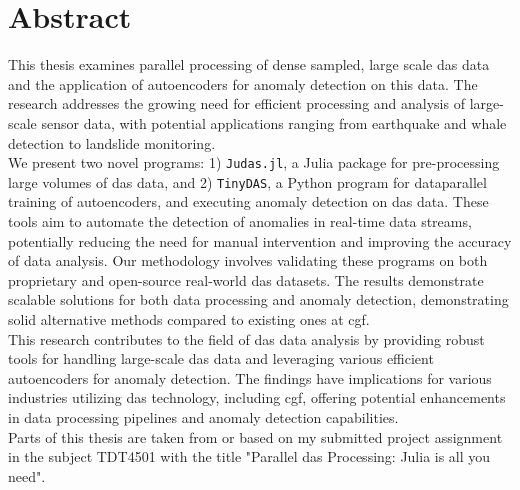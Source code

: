 \chapter*{Abstract}

This thesis examines parallel processing of dense sampled, large scale \acrfull{das} data and the application of autoencoders for anomaly detection on this data. The research addresses the growing need for efficient processing and analysis of large-scale sensor data, with potential applications ranging from earthquake and whale detection to landslide monitoring. \\

We present two novel programs: 1) \texttt{Judas.jl}, a Julia package for pre-processing large volumes of \acrshort{das} data, and 2) \texttt{TinyDAS}, a Python program for dataparallel training of autoencoders, and executing anomaly detection on \acrshort{das} data. These tools aim to automate the detection of anomalies in real-time data streams, potentially reducing the need for manual intervention and improving the accuracy of data analysis. Our methodology involves validating these programs on both proprietary and open-source real-world \acrshort{das} datasets. The results demonstrate scalable solutions for both data processing and anomaly detection, demonstrating solid alternative methods compared to existing ones at \acrfull{cgf}. \\

This research contributes to the field of \acrshort{das} data analysis by providing robust tools for handling large-scale \acrshort{das} data and leveraging various efficient autoencoders for anomaly detection. The findings have implications for various industries utilizing \acrshort{das} technology, including \acrshort{cgf}, offering potential enhancements in data processing pipelines and anomaly detection capabilities. \\

Parts of this thesis are taken from or based on my submitted project assignment in the subject TDT4501 with the title "Parallel \acrshort{das} Processing: Julia is all you need".